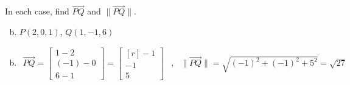 \documentclass[../main.tex]{subfiles}
\begin{document}
In each case, find $\overrightarrow{PQ}$ and $\|\overrightarrow{PQ}\|$.
\begin{enumerate}[a)]
	\setcounter{enumi}{1}
	\item $P(2, 0, 1)$, $Q(1, -1, 6)$
\end{enumerate}

\solution
\begin{enumerate}[a)]
	\setcounter{enumi}{1}
	\item 
		\begin{align*}
			\overrightarrow{PQ}
			=
			\begin{bmatrix}
				1 - 2 \\
				(-1) - 0 \\
				6 - 1
			\end{bmatrix}
			=
			\begin{bmatrix*}[r]
				-1 \\
				-1 \\
				5
			\end{bmatrix*}
			&,&
			\|\overrightarrow{PQ}\|
			=
			\sqrt{(-1)^2 + (-1)^2 + 5^2}
			=
			\sqrt{27}
		\end{align*}
\end{enumerate}
\end{document}
